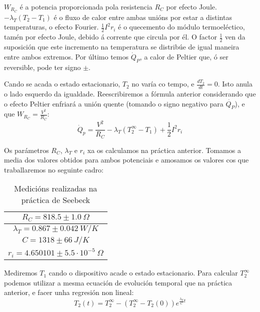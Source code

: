 \documentclass[12pt, a4paper, titlepage]{article}
\begin{document}
  $W_{R_C}$ é a potencia proporcionada pola resistencia $R_C$ por efecto Joule. $- \lambda_T(T_2 - T_1)$ é o fluxo de calor entre ambas unións por estar a distintas temperaturas, o efecto Fourier.
  $\frac{1}{2} I^2 r_i$ é o quecemento do módulo termoeléctico, tamén por efecto Joule, debido á corrente que circula por él. O factor $\frac{1}{2}$ ven da suposición que este incremento na temperatura se distribúe de igual maneira entre ambos extremos.
  Por último temos $\dot{Q}_P$, a calor de Peltier que, ó ser reversible, pode ter signo $\pm$.

  Cando se acada o estado estacionario, $T_2$ no varía co tempo, e $\frac{dT_2}{dt} = 0$. Isto anula o lado esquerdo da igualdade. Reescribiremos a fórmula anterior considerando que o efecto Peltier enfriará a unión quente (tomando o signo negativo para $\dot{Q_P}$), e que $W_{R_C} = \frac{V^2}{R_C}$:
  \begin{equation}
    \dot{Q}_p = \frac{V^2}{R_C} - \lambda_T(T_2^\infty - T_1) + \frac{1}{2} I^2 r_i
    \label{ec:balance_enerxetico_estacionario}
  \end{equation}

  Os parámetros $R_C$, $\lambda_T$ e $r_i$ xa os calculamos na práctica anterior. Tomamos a media dos valores obtidos para ambos potenciais e amosamos os valores cos que traballaremos no seguinte cadro:

  \begin{table}[H]
    \centering
    \begin{tabular}{|c|}
      \hline
      $R_C = 818.5 \pm 1.0 \ \Omega$ \\ \hline
      $\lambda_T = 0.867 \pm 0.042 \ W/K$ \\ \hline
      $C = 1318 \pm 66 \ J/K$ \\ \hline
      $r_i = 4.650101 \pm 5.5 \cdot 10^{-5} \ \Omega$\\ \hline
    \end{tabular}
    \caption{Medicións realizadas na práctica de Seebeck}
    \label{cad:practica_seebeck}
  \end{table}

  Mediremos $T_1$ cando o dispositivo acade o estado estacionario. Para calcular $T_2^\infty$ podemos utilizar a mesma ecuación de evolución temporal que na práctica anterior, e facer unha regresión non lineal:
  \begin{equation}
    T_2(t) = T_2^\infty - (T_2^\infty - T_2(0)) e^{\frac{\lambda_T}{C}t}
    \label{ec:t2_estacionario}
  \end{equation}
\end{document}

